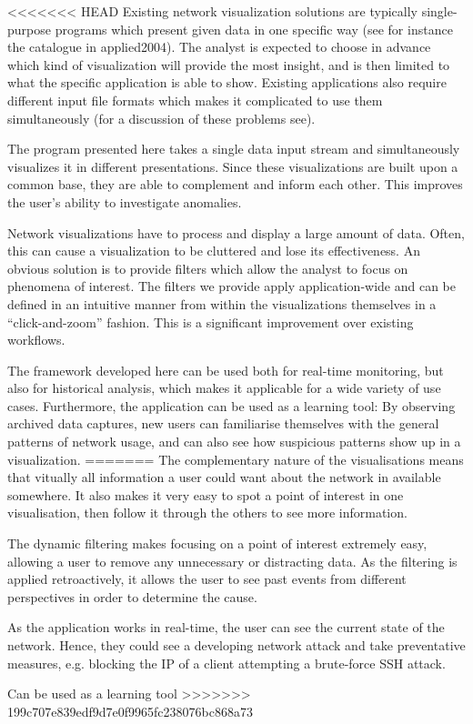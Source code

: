 <<<<<<< HEAD
Existing network visualization solutions are typically single-purpose programs which present given data in one specific way (see for instance the catalogue in  applied2004). The analyst is expected to choose in advance which kind of visualization will provide the most insight, and is then limited to what the specific application is able to show. Existing applications also require different input file formats which makes it complicated to use them simultaneously (for a discussion of these problems see). 

The program presented here takes a single data input stream and simultaneously visualizes it in different presentations. Since these visualizations are built upon a common base, they are able to complement and inform each other. This improves the user's ability to investigate anomalies.

Network visualizations have to process and display a large amount of data. Often, this can cause a visualization to be cluttered and lose its effectiveness. An obvious solution is to provide filters which allow the analyst to focus on phenomena of interest. The filters we provide apply application-wide and can be defined in an intuitive manner from within the visualizations themselves in a ``click-and-zoom'' fashion. This is a significant improvement over existing workflows.

The framework developed here can be used both for real-time monitoring, but also for historical analysis, which makes it applicable for a wide variety of use cases. Furthermore, the application can be used as a learning tool: By observing archived data captures, new users can familiarise themselves with the general patterns of network usage, and can also see how suspicious patterns show up in a visualization.
=======
The complementary nature of the visualisations means that vitually all information a user could want about the network in available somewhere.  It also makes it very easy to spot a point of interest in one visualisation, then follow it through the others to see more information.

The dynamic filtering makes focusing on a point of interest extremely easy, allowing a user to remove any unnecessary or distracting data.  As the filtering is applied retroactively, it allows the user to see past events from different perspectives in order to determine the cause.

As the application works in real-time, the user can see the current state of the network.  Hence, they could see a developing network attack and take preventative measures, e.g. blocking the IP of a client attempting a brute-force SSH attack.

Can be used as a learning tool
>>>>>>> 199c707e839edf9d7e0f9965fc238076bc868a73
